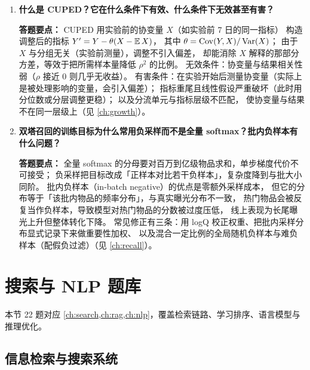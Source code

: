 \begin{interview}[题库与答题要点]
\begin{enumerate}[label=]
  \item[\textcolor{VioletDeep}{\textbf{Q35.}}] \textbf{什么是 CUPED？它在什么条件下有效、什么条件下无效甚至有害？}
\par\smallskip\noindent\textcolor{VioletDeep}{\textbf{答题要点：}}
CUPED 用实验前的协变量 $X$（如实验前 7 日的同一指标）
构造调整后的指标 $Y' = Y - \theta(X - \operatorname{\mathbb{E}} X)$，
其中 $\theta = \operatorname{Cov}(Y,X)/\operatorname{Var}(X)$；
由于 $X$ 与分组无关（实验前测量），调整不引入偏差，
却能消除 $X$ 解释的那部分方差，等效于把所需样本量降低 $\rho^2$ 的比例。
无效条件：协变量与结果相关性弱（$\rho$ 接近 0 则几乎无收益）。
有害条件：在实验开始后测量协变量（实际上是被处理影响的变量，会引入偏差）；
指标重尾且线性假设严重破坏（此时用分位数或分层调整更稳）；
以及分流单元与指标层级不匹配，
使协变量与结果不在同一层级上（见 \cref{ch:growth}）。

  \item[\textcolor{VioletDeep}{\textbf{Q36.}}] \textbf{双塔召回的训练目标为什么常用负采样而不是全量 softmax？批内负样本有什么问题？}
\par\smallskip\noindent\textcolor{VioletDeep}{\textbf{答题要点：}}
全量 softmax 的分母要对百万到亿级物品求和，单步梯度代价不可接受；
负采样把目标改成「正样本对比若干负样本」，复杂度降到与批大小同阶。
批内负样本（in-batch negative）的优点是零额外采样成本，
但它的分布等于「该批内物品的频率分布」，与真实曝光分布不一致，
热门物品会被反复当作负样本，导致模型对热门物品的分数被过度压低，
线上表现为长尾曝光上升但整体转化下降。
常见修正有三条：用 logQ 校正权重、把批内采样分布显式记录下来做重要性加权、
以及混合一定比例的全局随机负样本与难负样本（配假负过滤）（见 \cref{ch:recall}）。

\end{enumerate}

\end{interview}

\section{搜索与 NLP 题库}

本节 22 题对应 \cref{ch:search,ch:rag,ch:nlp}，覆盖检索链路、学习排序、语言模型与推理优化。

\subsection{信息检索与搜索系统}

